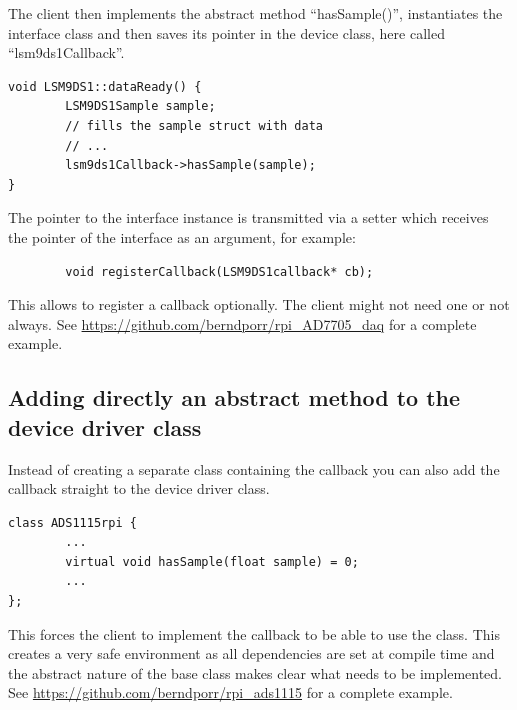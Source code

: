 \documentclass[12pt]{report}
\begin{document}
The client then implements the abstract method ``hasSample()'', instantiates
the interface class and then saves its pointer in the device class, here called ``lsm9ds1Callback''.
\begin{verbatim}
void LSM9DS1::dataReady() {
        LSM9DS1Sample sample;
        // fills the sample struct with data
        // ...
        lsm9ds1Callback->hasSample(sample);
}
\end{verbatim}
The pointer to the interface instance is transmitted via a setter which
receives the pointer of the interface as an argument, for example:
\begin{verbatim}
        void registerCallback(LSM9DS1callback* cb);
\end{verbatim}
This allows to register a callback optionally. The client might not need
one or not always.
See
\url{https://github.com/berndporr/rpi_AD7705_daq}
for a complete example.

\subsection{Adding directly an abstract method to the device driver class}
Instead of creating a separate class containing the callback you
can also add the callback straight to the device driver class.
\begin{verbatim}
class ADS1115rpi {
        ...
        virtual void hasSample(float sample) = 0;
        ...
};
\end{verbatim}
This forces the client to implement the callback to be able to use
the class. This creates a very safe environment as all dependencies
are set at compile time and the abstract nature of the base class
makes clear what needs to be implemented.
See
\url{https://github.com/berndporr/rpi_ads1115} for a complete example.
\end{document}
